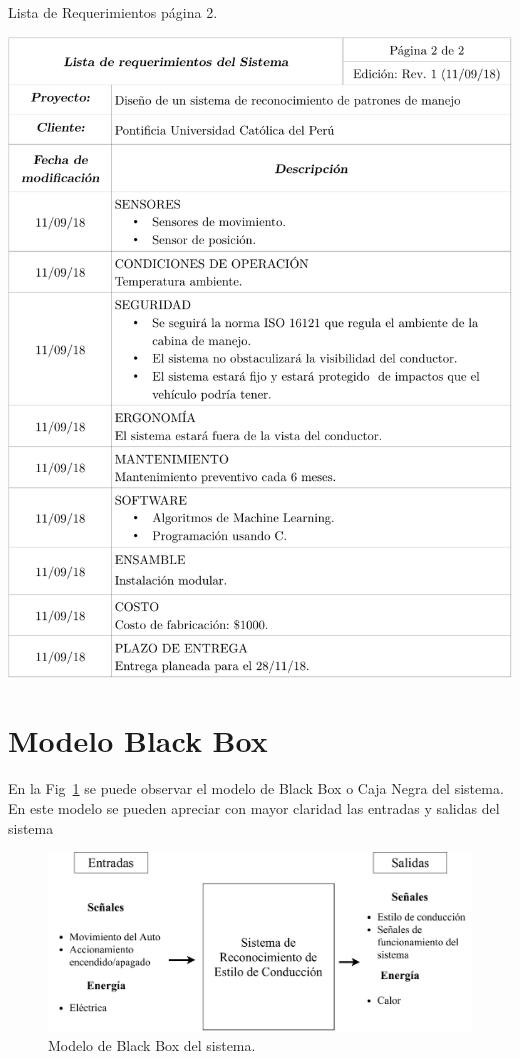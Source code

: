 \begin{table}[htbp!]
  \caption{Lista de Requerimientos página 2.}
  \label{diag:3.2}
  \includegraphics[width=1.05\linewidth]{Tab2.pdf}
\end{table}

\newpage

\section{Modelo Black Box}
En la Fig~\ref{fig:3.1} se puede observar el modelo de Black Box o Caja Negra del sistema. En este modelo se pueden apreciar con mayor claridad las entradas y salidas del sistema

\begin{figure}[htbp!]
\centering
\includegraphics[width=\textwidth]{Fig1.pdf}
\caption{Modelo de Black Box del sistema.}
\label{fig:3.1}
\end{figure}



